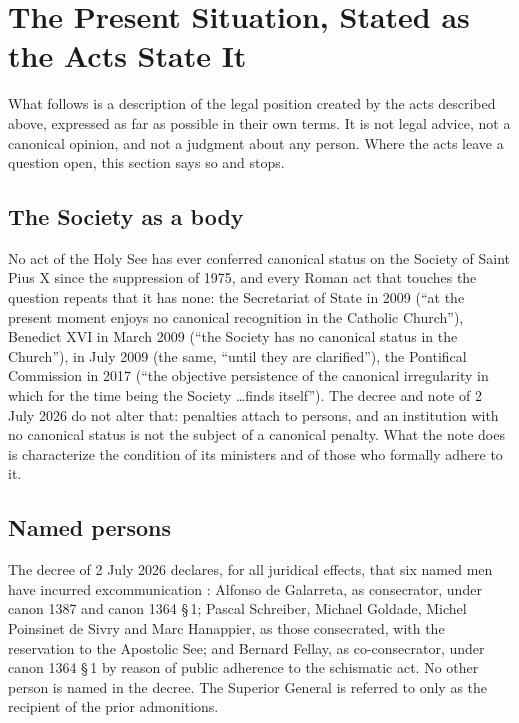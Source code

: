 \section{The Present Situation, Stated as the Acts State It}

What follows is a description of the legal position created by the acts
described above, expressed as far as possible in their own terms. It is
not legal advice, not a canonical opinion, and not a judgment about any
person. Where the acts leave a question open, this section says so and
stops.

\subsection{The Society as a body}

No act of the Holy See has ever conferred canonical status on the Society
of Saint Pius X since the suppression of 1975, and every Roman act that
touches the question repeats that it has none: the Secretariat of State
in 2009 (``at the present moment enjoys no canonical recognition in the
Catholic Church''), Benedict XVI in March 2009 (``the Society has no
canonical status in the Church''),  in July 2009
(the same, ``until they are clarified''), the Pontifical Commission
 in 2017 (``the objective persistence of the canonical
irregularity in which for the time being the Society \ldots finds
itself''). The decree and note of 2 July 2026 do not alter that: penalties
attach to persons, and an institution with no canonical status is not the
subject of a canonical penalty. What the note does is characterize the
condition of its ministers and of those who formally adhere to it.

\subsection{Named persons}

The decree of 2 July 2026 declares, for all juridical effects, that six
named men have incurred excommunication :
Alfonso de Galarreta, as consecrator, under canon 1387 and canon 1364
\S\,1; Pascal Schreiber, Michael Goldade, Michel Poinsinet de Sivry and
Marc Hanappier, as those consecrated, with the reservation to the
Apostolic See; and Bernard Fellay, as co-consecrator, under canon 1364
\S\,1 by reason of public adherence to the schismatic act. No other
person is named in the decree. The Superior General is referred to only
as the recipient of the prior admonitions.

